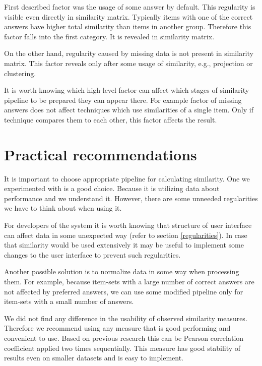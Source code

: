 \documentclass[
  digital, %
  table,   %
  nolof,     %
  nolot,     %
  nocover,
  color,
  final, %
]{fithesis3}
\begin{document}
First described factor was the usage of some answer by default. This regularity is visible even directly in similarity matrix. Typically items with one of the correct answers have higher total similarity than items in another group. Therefore this factor falls into the first category. It is revealed in similarity matrix.

On the other hand, regularity caused by missing data is not present in similarity matrix. This factor reveals only after some usage of similarity, e.g., projection or clustering.

It is worth knowing which high-level factor can affect which stages of similarity pipeline to be prepared they can appear there. For example factor of missing answers does not affect techniques which use similarities of a single item. Only if technique compares them to each other, this factor affects the result.


\section{Practical recommendations}\label{practical-recommendations}


It is important to choose appropriate pipeline for calculating similarity. One we experimented with is a good choice. Because it is utilizing data about performance and we understand it. However, there are some unneeded regularities we have to think about when using it.

For developers of the system it is worth knowing that structure of user interface can affect data in some unexpected way (refer to section \ref{regularities}). In case that similarity would be used extensively it may be useful to implement some changes to the user interface to prevent such regularities.


Another possible solution is to normalize data in some way when processing them. For example, because item-sets with a large number of correct answers are not affected by preferred answers, we can use some modified pipeline only for item-sets with a small number of answers.


We did not find any difference in the usability of observed similarity measures. Therefore we recommend using any measure that is good performing and convenient to use. Based on previous research this can be Pearson correlation coefficient applied two times sequentially. This measure has good stability of results even on smaller datasets and is easy to implement.
\end{document}
